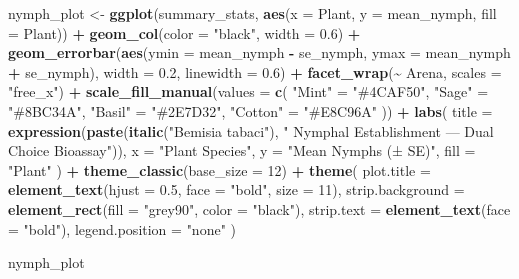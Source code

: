 \documentclass[
]{article}
\newenvironment{Shaded}{\begin{snugshade}}{\end{snugshade}}
\newcommand{\AttributeTok}[1]{\textcolor[rgb]{0.13,0.29,0.53}{#1}}
\newcommand{\DecValTok}[1]{\textcolor[rgb]{0.00,0.00,0.81}{#1}}
\newcommand{\FloatTok}[1]{\textcolor[rgb]{0.00,0.00,0.81}{#1}}
\newcommand{\FunctionTok}[1]{\textcolor[rgb]{0.13,0.29,0.53}{\textbf{#1}}}
\newcommand{\NormalTok}[1]{#1}
\newcommand{\OtherTok}[1]{\textcolor[rgb]{0.56,0.35,0.01}{#1}}
\newcommand{\SpecialCharTok}[1]{\textcolor[rgb]{0.81,0.36,0.00}{\textbf{#1}}}
\newcommand{\StringTok}[1]{\textcolor[rgb]{0.31,0.60,0.02}{#1}}
\begin{document}
\begin{Shaded}
\begin{Highlighting}[]
\NormalTok{nymph\_plot }\OtherTok{\textless{}{-}} \FunctionTok{ggplot}\NormalTok{(summary\_stats,}
       \FunctionTok{aes}\NormalTok{(}\AttributeTok{x =}\NormalTok{ Plant, }\AttributeTok{y =}\NormalTok{ mean\_nymph, }\AttributeTok{fill =}\NormalTok{ Plant)) }\SpecialCharTok{+}
  \FunctionTok{geom\_col}\NormalTok{(}\AttributeTok{color =} \StringTok{"black"}\NormalTok{, }\AttributeTok{width =} \FloatTok{0.6}\NormalTok{) }\SpecialCharTok{+}
  \FunctionTok{geom\_errorbar}\NormalTok{(}\FunctionTok{aes}\NormalTok{(}\AttributeTok{ymin =}\NormalTok{ mean\_nymph }\SpecialCharTok{{-}}\NormalTok{ se\_nymph,}
                    \AttributeTok{ymax =}\NormalTok{ mean\_nymph }\SpecialCharTok{+}\NormalTok{ se\_nymph),}
                \AttributeTok{width =} \FloatTok{0.2}\NormalTok{, }\AttributeTok{linewidth =} \FloatTok{0.6}\NormalTok{) }\SpecialCharTok{+}
  \FunctionTok{facet\_wrap}\NormalTok{(}\SpecialCharTok{\textasciitilde{}}\NormalTok{ Arena, }\AttributeTok{scales =} \StringTok{"free\_x"}\NormalTok{) }\SpecialCharTok{+}
  \FunctionTok{scale\_fill\_manual}\NormalTok{(}\AttributeTok{values =} \FunctionTok{c}\NormalTok{(}
    \StringTok{"Mint"}   \OtherTok{=} \StringTok{"\#4CAF50"}\NormalTok{,}
    \StringTok{"Sage"}   \OtherTok{=} \StringTok{"\#8BC34A"}\NormalTok{,}
    \StringTok{"Basil"}  \OtherTok{=} \StringTok{"\#2E7D32"}\NormalTok{,}
    \StringTok{"Cotton"} \OtherTok{=} \StringTok{"\#E8C96A"}
\NormalTok{  )) }\SpecialCharTok{+}
  \FunctionTok{labs}\NormalTok{(}
    \AttributeTok{title =} \FunctionTok{expression}\NormalTok{(}\FunctionTok{paste}\NormalTok{(}\FunctionTok{italic}\NormalTok{(}\StringTok{"Bemisia tabaci"}\NormalTok{), }\StringTok{" Nymphal Establishment — Dual Choice Bioassay"}\NormalTok{)),}
    \AttributeTok{x     =} \StringTok{"Plant Species"}\NormalTok{,}
    \AttributeTok{y     =} \StringTok{"Mean Nymphs (± SE)"}\NormalTok{,}
    \AttributeTok{fill  =} \StringTok{"Plant"}
\NormalTok{  ) }\SpecialCharTok{+}
  \FunctionTok{theme\_classic}\NormalTok{(}\AttributeTok{base\_size =} \DecValTok{12}\NormalTok{) }\SpecialCharTok{+}
  \FunctionTok{theme}\NormalTok{(}
    \AttributeTok{plot.title       =} \FunctionTok{element\_text}\NormalTok{(}\AttributeTok{hjust =} \FloatTok{0.5}\NormalTok{, }\AttributeTok{face =} \StringTok{"bold"}\NormalTok{, }\AttributeTok{size =} \DecValTok{11}\NormalTok{),}
    \AttributeTok{strip.background =} \FunctionTok{element\_rect}\NormalTok{(}\AttributeTok{fill =} \StringTok{"grey90"}\NormalTok{, }\AttributeTok{color =} \StringTok{"black"}\NormalTok{),}
    \AttributeTok{strip.text       =} \FunctionTok{element\_text}\NormalTok{(}\AttributeTok{face =} \StringTok{"bold"}\NormalTok{),}
    \AttributeTok{legend.position  =} \StringTok{"none"}
\NormalTok{  )}

\NormalTok{nymph\_plot}
\end{Highlighting}
\end{Shaded}
\end{document}
